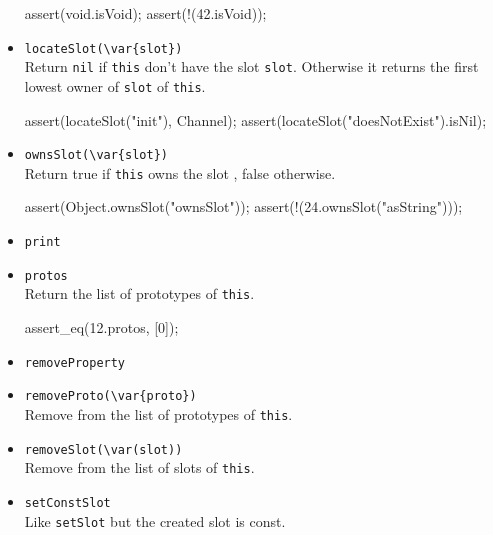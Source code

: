 \begin{itemize}
\begin{urbiscript}[firstnumber=last]
assert(void.isVoid);
assert(!(42.isVoid));
\end{urbiscript}

\item \lstinline|locateSlot(\var{slot})|\\
  Return \lstinline|nil| if \lstinline|this| don't have the slot
  \lstinline|slot|. Otherwise it returns the first lowest owner of
  \lstinline|slot| of \lstinline|this|.

\begin{urbiscript}[firstnumber=last]
assert(locateSlot("init"), Channel);
assert(locateSlot("doesNotExist").isNil);
\end{urbiscript}

\item \lstinline|ownsSlot(\var{slot})|\\
  Return true if \lstinline|this| owns the slot , false
  otherwise.

\begin{urbiscript}[firstnumber=last]
assert(Object.ownsSlot("ownsSlot"));
assert(!(24.ownsSlot("asString")));
\end{urbiscript}

\item \lstinline|print|\\

\item \lstinline|protos|\\
  Return the list of prototypes of \lstinline|this|.
\begin{urbiscript}[firstnumber=last]
assert_eq(12.protos, [0]);
\end{urbiscript}

\item \lstinline|removeProperty|\\

\item \lstinline|removeProto(\var{proto})|\\
  Remove  from the list of prototypes of \lstinline|this|.

\item \lstinline|removeSlot(\var(slot))|\\
  Remove  from the list of slots of \lstinline|this|.

\item \lstinline|setConstSlot|\\
  Like \lstinline|setSlot| but the created slot is const.


\end{itemize}
